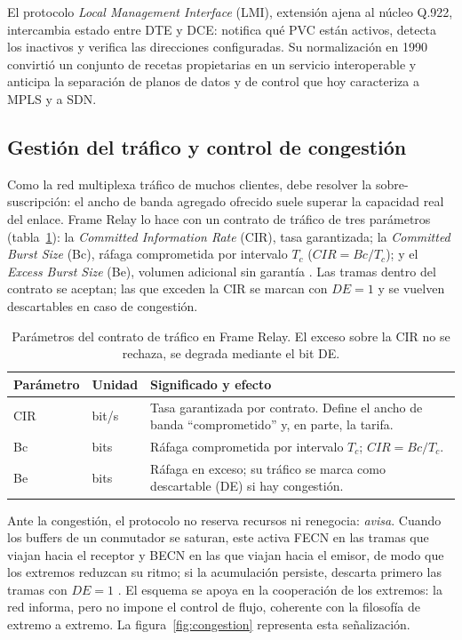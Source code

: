 \documentclass[12pt,a4paper]{article}
\begin{document}
El protocolo \emph{Local Management Interface} (LMI), extensión ajena al núcleo Q.922, intercambia estado entre DTE y DCE: notifica qué PVC están activos, detecta los inactivos y verifica las direcciones configuradas. Su normalización en 1990 convirtió un conjunto de recetas propietarias en un servicio interoperable \cite{frf1, cisco} y anticipa la separación de planos de datos y de control que hoy caracteriza a MPLS y a SDN.

\subsection{Gestión del tráfico y control de congestión}

Como la red multiplexa tráfico de muchos clientes, debe resolver la sobre-suscripción: el ancho de banda agregado ofrecido suele superar la capacidad real del enlace. Frame Relay lo hace con un contrato de tráfico de tres parámetros (tabla~\ref{tab:cir}): la \emph{Committed Information Rate} (CIR), tasa garantizada; la \emph{Committed Burst Size} (Bc), ráfaga comprometida por intervalo $T_c$ ($CIR = Bc/T_c$); y el \emph{Excess Burst Size} (Be), volumen adicional sin garantía \cite{cisco, stallings2014}. Las tramas dentro del contrato se aceptan; las que exceden la CIR se marcan con $DE=1$ y se vuelven descartables en caso de congestión.

\begin{table}[h]
    \centering
    \small
    \begin{tabularx}{\textwidth}{l l X}
        \toprule
        \textbf{Parámetro} & \textbf{Unidad} & \textbf{Significado y efecto} \\
        \midrule
        CIR & bit/s & Tasa garantizada por contrato. Define el ancho de banda ``comprometido'' y, en parte, la tarifa. \\
        Bc  & bits & Ráfaga comprometida por intervalo $T_c$; $CIR = Bc / T_c$. \\
        Be  & bits & Ráfaga en exceso; su tráfico se marca como descartable (DE) si hay congestión. \\
        \bottomrule
    \end{tabularx}
    \caption{Parámetros del contrato de tráfico en Frame Relay. El exceso sobre la CIR no se rechaza, se degrada mediante el bit DE.}
    \label{tab:cir}
\end{table}

Ante la congestión, el protocolo no reserva recursos ni renegocia: \emph{avisa}. Cuando los buffers de un conmutador se saturan, este activa FECN en las tramas que viajan hacia el receptor y BECN en las que viajan hacia el emisor, de modo que los extremos reduzcan su ritmo; si la acumulación persiste, descarta primero las tramas con $DE=1$ \cite{cisco, stallings2014}. El esquema se apoya en la cooperación de los extremos: la red informa, pero no impone el control de flujo, coherente con la filosofía de extremo a extremo. La figura~\ref{fig:congestion} representa esta señalización.
\end{document}
